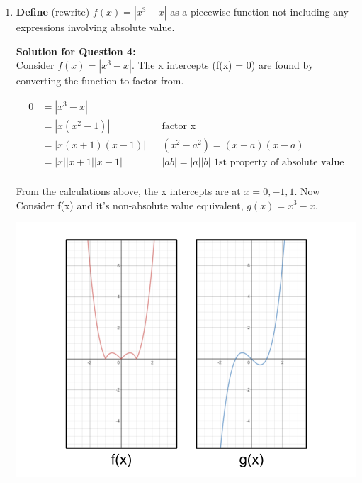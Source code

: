 \documentclass[12pt]{book}
\begin{document}
\begin{enumerate}
\begin{proof}
\end{proof}

\newpage

\item \textbf{Define} (rewrite) $f(x) = |x^3 - x|$ as a piecewise function not including any expressions involving absolute value.

\vspace{0.3cm} 
\textbf{Solution for Question 4:}\\

Consider $f(x) = |x^3-x|$. The x intercepts (f(x) = 0) are found by converting the function to factor from.

\begin{align*}
    0 &= |x^3-x| \\
    &= |x(x^2-1)| && \text{factor x}\\
    &= |x(x+1)(x-1)| && (x^2-a^2) = (x+a)(x-a)\\
    &= |x||x+1||x-1| && |ab| = |a||b| \text{ 1st property of absolute value}\\
\end{align*}

\vspace{-2em}
From the calculations above, the x intercepts are at $x = 0, -1, 1$. Now Consider f(x) and it's non-absolute value equivalent, $g(x) = x^3-x$.
\vspace{-1em}

\begin{center}
    \includegraphics[scale = 0.5]{A1-4 diagram.png}
\end{center}


\end{enumerate}
\end{document}
